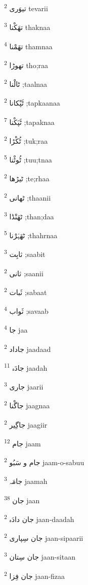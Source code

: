 \documentclass[12pt]{article}
\begin{document}
\begin{RTL}
\begin{multicols}{5}
{\ur تیوَری}   \textsuperscript{2} tevarii

{\ur تھَکْنا}   \textsuperscript{3} thaknaa

{\ur تھَمْنا}   \textsuperscript{4} thamnaa

{\ur تھوڑا}   \textsuperscript{2} tho;raa

{\ur ٹالْنا}   \textsuperscript{2} ;taalnaa

{\ur ٹَپْکانا}   \textsuperscript{2} ;tapkaanaa

{\ur ٹَپَکْنا}   \textsuperscript{7} ;tapaknaa

{\ur ٹُکْڑا}   \textsuperscript{2} ;tuk;raa

{\ur ٹُوٹْنا}   \textsuperscript{5} ;tuu;tnaa

{\ur ٹیڑھا}   \textsuperscript{2} ;te;rhaa

{\ur ٹھانی}   \textsuperscript{2} ;thaanii

{\ur ٹھَنْڈا}   \textsuperscript{3} ;than;daa

{\ur ٹھَہْرْنا}   \textsuperscript{5} ;thahrnaa

{\ur ثابِت}   \textsuperscript{3} ;saabit

{\ur ثانی}   \textsuperscript{2} ;saanii

{\ur ثَبات}   \textsuperscript{2} ;sabaat

{\ur ثَواب}   \textsuperscript{4} ;savaab

{\ur جا}   \textsuperscript{4} jaa

{\ur جاداد}   \textsuperscript{2} jaadaad

{\ur جادَہ}   \textsuperscript{11} jaadah

{\ur جاری}   \textsuperscript{3} jaarii

{\ur جاگْنا}   \textsuperscript{2} jaagnaa

{\ur جاگِیر}   \textsuperscript{2} jaagiir

{\ur جام}   \textsuperscript{12} jaam

{\ur جام و سَبُو}   \textsuperscript{2} jaam-o-sabuu

{\ur جامَہ}   \textsuperscript{3} jaamah

{\ur جان}   \textsuperscript{38} jaan

{\ur جان دادَہ}   \textsuperscript{2} jaan-daadah

{\ur جان سِپاری}   \textsuperscript{2} jaan-sipaarii

{\ur جان سِتان}   \textsuperscript{3} jaan-sitaan

{\ur جان فِزا}   \textsuperscript{2} jaan-fizaa


\end{multicols}
\end{RTL}
\end{document}
